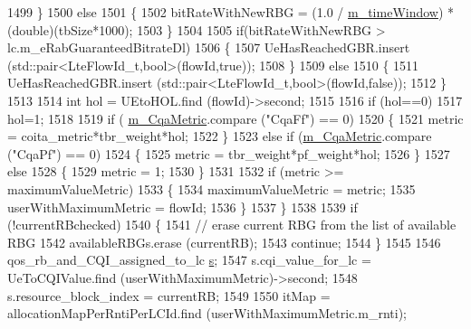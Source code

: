 \begin{DoxyCode}
1499                 \}
1500               \textcolor{keywordflow}{else}
1501                 \{
1502                   bitRateWithNewRBG = (1.0 / \hyperlink{classns3_1_1CqaFfMacScheduler_a2e6951b5a91130305fe3d835bca0f33d}{m\_timeWindow}) * (\textcolor{keywordtype}{double})(tbSize*1000);
1503                 \}
1504 
1505               \textcolor{keywordflow}{if}(bitRateWithNewRBG > lc.m\_eRabGuaranteedBitrateDl)
1506                 \{
1507                   UeHasReachedGBR.insert (std::pair<LteFlowId\_t,bool>(flowId,\textcolor{keyword}{true}));
1508                 \}
1509               \textcolor{keywordflow}{else}
1510                 \{
1511                   UeHasReachedGBR.insert (std::pair<LteFlowId\_t,bool>(flowId,\textcolor{keyword}{false}));
1512                 \}
1513 
1514               \textcolor{keywordtype}{int} hol = UEtoHOL.find (flowId)->second;
1515 
1516               \textcolor{keywordflow}{if} (hol==0)
1517                 hol=1;
1518 
1519               \textcolor{keywordflow}{if} ( \hyperlink{classns3_1_1CqaFfMacScheduler_aed5322f441dd060a332fe6e34c0d7d7c}{m\_CqaMetric}.compare (\textcolor{stringliteral}{"CqaFf"}) == 0)
1520                 \{
1521                   metric = coita\_metric*tbr\_weight*hol;
1522                 \}
1523               \textcolor{keywordflow}{else} \textcolor{keywordflow}{if} (\hyperlink{classns3_1_1CqaFfMacScheduler_aed5322f441dd060a332fe6e34c0d7d7c}{m\_CqaMetric}.compare (\textcolor{stringliteral}{"CqaPf"}) == 0)
1524                 \{
1525                   metric = tbr\_weight*pf\_weight*hol;
1526                 \}
1527               \textcolor{keywordflow}{else}
1528                 \{
1529                   metric = 1;
1530                 \}
1531 
1532               \textcolor{keywordflow}{if} (metric >= maximumValueMetric)
1533                 \{
1534                   maximumValueMetric = metric;
1535                   userWithMaximumMetric = flowId;
1536                 \}
1537             \}
1538 
1539           \textcolor{keywordflow}{if} (!currentRBchecked)
1540             \{
1541               \textcolor{comment}{// erase current RBG from the list of available RBG}
1542               availableRBGs.erase (currentRB);
1543               \textcolor{keywordflow}{continue};
1544             \}
1545 
1546           qos\_rb\_and\_CQI\_assigned\_to\_lc \hyperlink{generate__test__data__lte__sinr_8m_ad83eeb3a142285d1243a08c6b7026df8}{s};
1547           s.cqi\_value\_for\_lc = UeToCQIValue.find (userWithMaximumMetric)->second;
1548           s.resource\_block\_index = currentRB;
1549 
1550           itMap = allocationMapPerRntiPerLCId.find (userWithMaximumMetric.m\_rnti);

\end{DoxyCode}
